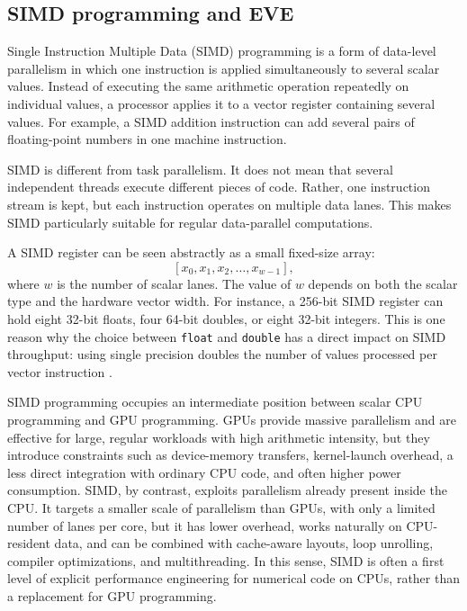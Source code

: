\documentclass[11pt,a4paper]{article}
\newcommand{\code}[1]{\texttt{#1}}
\begin{document}
\subsection{SIMD programming and EVE}

Single Instruction Multiple Data (SIMD) programming is a form of data-level parallelism in which one instruction is applied simultaneously to several scalar values. Instead of executing the same arithmetic operation repeatedly on individual values, a processor applies it to a vector register containing several values. For example, a SIMD addition instruction can add several pairs of floating-point numbers in one machine instruction.

SIMD is different from task parallelism. It does not mean that several independent threads execute different pieces of code. Rather, one instruction stream is kept, but each instruction operates on multiple data lanes. This makes SIMD particularly suitable for regular data-parallel computations.

A SIMD register can be seen abstractly as a small fixed-size array:
\[
[x_0, x_1, x_2, \ldots, x_{w-1}],
\]
where \(w\) is the number of scalar lanes. The value of \(w\) depends on both the scalar type and the hardware vector width. For instance, a 256-bit SIMD register can hold eight 32-bit floats, four 64-bit doubles, or eight 32-bit integers. This is one reason why the choice between \code{float} and \code{double} has a direct impact on SIMD throughput: using single precision doubles the number of values processed per vector instruction \cite{intelIntrinsics}.

SIMD programming occupies an intermediate position between scalar CPU programming and GPU programming. GPUs provide massive parallelism and are effective for large, regular workloads with high arithmetic intensity, but they introduce constraints such as device-memory transfers, kernel-launch overhead, a less direct integration with ordinary CPU code, and often higher power consumption. SIMD, by contrast, exploits parallelism already present inside the CPU. It targets a smaller scale of parallelism than GPUs, with only a limited number of lanes per core, but it has lower overhead, works naturally on CPU-resident data, and can be combined with cache-aware layouts, loop unrolling, compiler optimizations, and multithreading. In this sense, SIMD is often a first level of explicit performance engineering for numerical code on CPUs, rather than a replacement for GPU programming.
\end{document}
